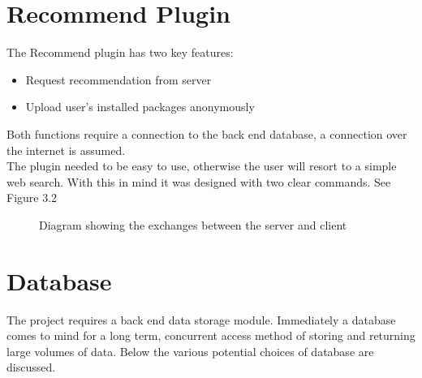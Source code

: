 \documentclass{l4proj}
\begin{document}
\section{Recommend Plugin}
The Recommend plugin has two key features:
\begin{itemize}
\item Request recommendation from server
\item Upload user's installed packages anonymously
\end{itemize}
Both functions require a connection to the back end database, a connection over the internet is assumed.\\
The plugin needed to be easy to use, otherwise the user will resort to a simple web search. With this in mind it was designed with two clear commands. See Figure 3.2\\
\begin{figure}
\centerline{}
\caption{Diagram showing the exchanges between the server and client}
\end{figure}
\newpage

\section{Database}
The project requires a back end data storage module. Immediately a database comes to mind for a long term, concurrent access method of storing and returning large volumes of data. Below the various potential choices of database are discussed.
\end{document}
